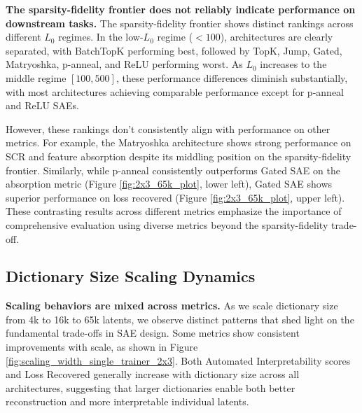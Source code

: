 \documentclass{article}
\theoremstyle{plain}
\theoremstyle{definition}
\theoremstyle{remark}
\begin{document}
\textbf{The sparsity-fidelity frontier does not reliably indicate performance on downstream tasks.}
The sparsity-fidelity frontier shows distinct rankings across different $L_0$ regimes. In the low-$L_0$ regime ($< 100$), architectures are clearly separated, with BatchTopK performing best, followed by TopK, Jump, Gated, Matryoshka, p-anneal, and ReLU performing worst. As $L_0$ increases to the middle regime $[100, 500]$, these performance differences diminish substantially, with most architectures achieving comparable performance except for p-anneal and ReLU SAEs.

However, these rankings don't consistently align with performance on other metrics. For example, the Matryoshka architecture shows strong performance on SCR and feature absorption despite its middling position on the sparsity-fidelity frontier. Similarly, while p-anneal consistently outperforms Gated SAE on the absorption metric (Figure \ref{fig:2x3_65k_plot}, lower left), Gated SAE shows superior performance on loss recovered (Figure \ref{fig:2x3_65k_plot}, upper left). These contrasting results across different metrics emphasize the importance of comprehensive evaluation using diverse metrics beyond the sparsity-fidelity trade-off.

\subsection{Dictionary Size Scaling Dynamics}

\textbf{Scaling behaviors are mixed across metrics.} As we scale dictionary size from 4k to 16k to 65k latents, we observe distinct patterns that shed light on the fundamental trade-offs in SAE design. Some metrics show consistent improvements with scale, as shown in Figure \ref{fig:scaling_width_single_trainer_2x3}. Both Automated Interpretability scores and Loss Recovered generally increase with dictionary size across all architectures, suggesting that larger dictionaries enable both better reconstruction and more interpretable individual latents.
\end{document}
